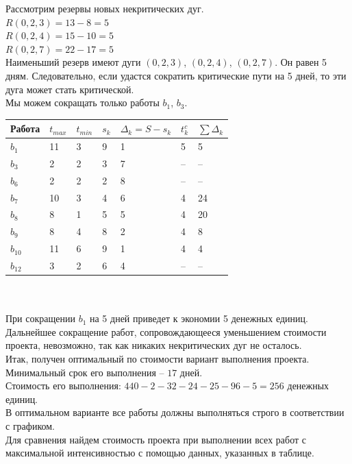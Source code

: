 \documentclass[a4paper, 12pt]{report}
\begin{document}
	Рассмотрим резервы новых некритических дуг.\\
	$R(0,2,3)=13-8=5$\\
	$R(0,2,4)=15-10=5$\\
	$R(0,2,7)=22-17=5$\\
	Наименьший резерв имеют дуги $(0,2,3)$, $(0,2,4)$, $(0,2,7)$. Он равен 5 дням. Следовательно, если удастся сократить критические пути на 5 дней, то эти дуга может стать критической.\\
	Мы можем сокращать только работы $b_1$, $b_3$.\\
	\begin{tabular}{ |p{2cm}||p{1cm}||p{1cm}||p{1cm}||p{3cm}||p{2cm}||p{2cm}|}
		\hline
		Работа & $t_{max}$ & $t_{min}$ & $s_k$ & $\Delta_k=S-s_k$ & $t_k^c$& $\sum \Delta_k$\\
		\hline
		$b_1$ & 11 & 3 & 9 & 1 & 5 & 5\\
		$b_3$ & 2 & 2 & 3 & 7 & -- & --\\
		$b_6$ & 2 & 2 & 2 & 8 & -- & --\\
		$b_7$&10&3&4&6& 4 & 24\\
		$b_8$ & 8 & 1 & 5 & 5 & 4 & 20\\
		$b_{9}$ & 8 & 4 & 8 & 2 & 4 & 8 \\
		$b_{10}$&11&6&9&1& 4&4\\
		$b_{12}$ & 3 & 2 & 6 & 4 & -- & --\\
		\hline
	\end{tabular}\\\\
	При сокращении $b_1$ на 5 дней приведет к экономии 5 денежных единиц.
	Дальнейшее сокращение работ, сопровождающееся уменьшением
	стоимости проекта, невозможно, так как никаких некритических дуг не осталось.\\
	Итак, получен оптимальный по стоимости вариант выполнения
	проекта.\\
	Минимальный срок его выполнения -- $17$ дней.\\
	Стоимость его выполнения: $440-2-32-24-25-96-5=256$ денежных единиц.\\
	В оптимальном варианте все работы должны выполняться строго в соответствии с графиком.\\
	Для сравнения найдем стоимость проекта при выполнении всех работ с максимальной интенсивностью с помощью данных, указанных в таблице.\\
\end{document}
